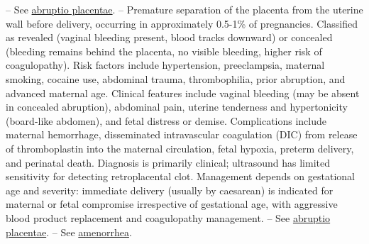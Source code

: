 -- See \hyperlink{Abruptio Placentae}{abruptio placentae}.
-- Premature separation of the placenta from the uterine wall before delivery, occurring in approximately 0.5-1\% of pregnancies. Classified as revealed (vaginal bleeding present, blood tracks downward) or concealed (bleeding remains behind the placenta, no visible bleeding, higher risk of coagulopathy). Risk factors include hypertension, preeclampsia, maternal smoking, cocaine use, abdominal trauma, thrombophilia, prior abruption, and advanced maternal age. Clinical features include vaginal bleeding (may be absent in concealed abruption), abdominal pain, uterine tenderness and hypertonicity (board-like abdomen), and fetal distress or demise. Complications include maternal hemorrhage, disseminated intravascular coagulation (DIC) from release of thromboplastin into the maternal circulation, fetal hypoxia, preterm delivery, and perinatal death. Diagnosis is primarily clinical; ultrasound has limited sensitivity for detecting retroplacental clot. Management depends on gestational age and severity: immediate delivery (usually by caesarean) is indicated for maternal or fetal compromise irrespective of gestational age, with aggressive blood product replacement and coagulopathy management.
-- See \hyperlink{Abruptio Placentae}{abruptio placentae}.
-- See \hyperlink{Amenorrhea}{amenorrhea}.

